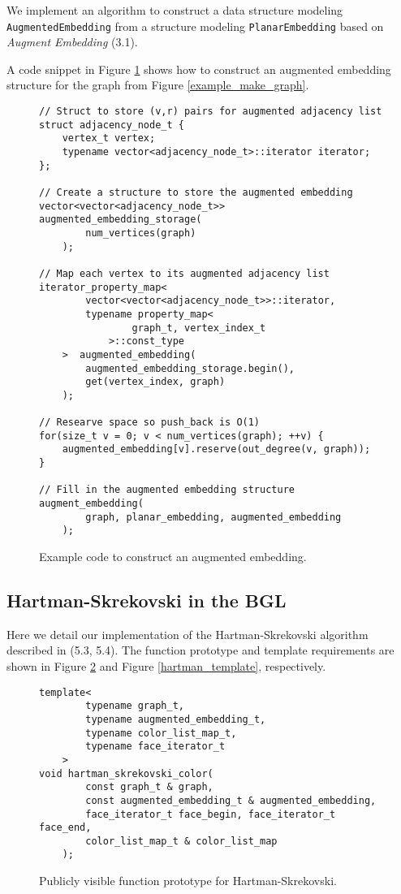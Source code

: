 \documentclass[letterpaper, 12pt]{article}
\theoremstyle{definition}
\theoremstyle{definition}
\theoremstyle{thm}
\theoremstyle{definition}
\begin{document}
We implement an algorithm to construct a data structure modeling
\texttt{Augmented{\allowbreak}Embedding}
from a structure modeling \texttt{PlanarEmbedding} based on \textit{Augment
Embedding} (3.1).

A code snippet in Figure \ref{example_augment_embedding} shows how to
construct an augmented embedding structure for the graph from Figure
\ref{example_make_graph}.

\begin{figure}
\begin{lstlisting}[frame=single]
// Struct to store (v,r) pairs for augmented adjacency list
struct adjacency_node_t {
    vertex_t vertex;
    typename vector<adjacency_node_t>::iterator iterator;
};

// Create a structure to store the augmented embedding
vector<vector<adjacency_node_t>> augmented_embedding_storage(
        num_vertices(graph)
    );

// Map each vertex to its augmented adjacency list
iterator_property_map<
        vector<vector<adjacency_node_t>>::iterator,
        typename property_map<
                graph_t, vertex_index_t
            >::const_type
    >  augmented_embedding(
        augmented_embedding_storage.begin(),
        get(vertex_index, graph)
    );

// Researve space so push_back is O(1)
for(size_t v = 0; v < num_vertices(graph); ++v) {
    augmented_embedding[v].reserve(out_degree(v, graph));
}

// Fill in the augmented embedding structure
augment_embedding(
        graph, planar_embedding, augmented_embedding
    );
\end{lstlisting}
\caption{Example code to construct an augmented embedding.}
\label{example_augment_embedding}
\end{figure}

\subsection{Hartman-Skrekovski in the BGL}

Here we detail our implementation of the Hartman-Skrekovski algorithm described
in (5.3, 5.4). The
function prototype and template requirements are shown
in Figure \ref{hartman_prototype} and Figure \ref{hartman_template},
respectively.

\begin{figure}
\begin{lstlisting}[frame=single]
template<
        typename graph_t,
        typename augmented_embedding_t,
        typename color_list_map_t,
        typename face_iterator_t
    >
void hartman_skrekovski_color(
        const graph_t & graph,
        const augmented_embedding_t & augmented_embedding,
        face_iterator_t face_begin, face_iterator_t face_end,
        color_list_map_t & color_list_map
    );
\end{lstlisting}
\caption{Publicly visible function prototype for Hartman-Skrekovski.}
\label{hartman_prototype}
\end{figure}
\end{document}
